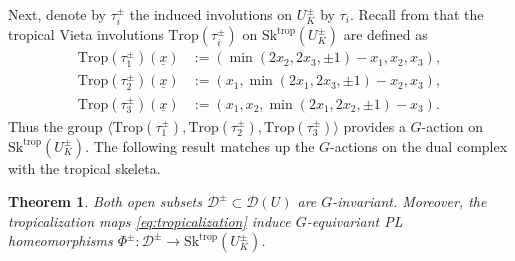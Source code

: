 \documentclass[reqno, 12pt]{amsart}
\newtheorem{thm}[prop]{Theorem}
\theoremstyle{definition}
\newcommand{\cD}{\mathcal{D}}
\newcommand{\Trop}{\mathrm{Trop}}
\newcommand{\trop}{\mathrm{trop}}
\newcommand{\Sk}{\mathrm{Sk}}
\newcommand{\ux}{\underline{x}}
\numberwithin{equation}{section}
\begin{document}

Next, denote by $\tau_i^{\pm}$ the induced involutions on $U_K^{\pm}$ by $\tau_i$. Recall from \cite[(3.1)--(3.3)]{Jan23} that the tropical Vieta involutions $\Trop(\tau_i^{\pm})$ on $\Sk^{\trop}(U_K^{\pm})$ are defined as 
\begin{align*}
\Trop(\tau_1^{\pm})(\ux) & := (\min(2x_2, 2x_3, \pm 1)-x_1, x_2, x_3), \\
\Trop(\tau_2^{\pm})(\ux) & := (x_1, \min(2x_1, 2x_3, \pm 1)-x_2, x_3), \\
\Trop(\tau_3^{\pm})(\ux) & := (x_1, x_2, \min(2x_1, 2x_2, \pm 1)-x_3).
\end{align*}
Thus the group $\langle \Trop(\tau_1^{\pm}), \Trop(\tau_2^{\pm}), \Trop(\tau_3^{\pm})\rangle$ provides a $G$-action on $\Sk^{\trop}(U_K^{\pm})$. The following result matches up the $G$-actions on the dual complex with the tropical skeleta.

\begin{thm}\label{thm:trop-iso-action}
Both open subsets $\cD^{\pm}\subset \cD(U)$ are $G$-invariant. Moreover, the tropicalization maps \eqref{eq:tropicalization} induce $G$-equivariant PL homeomorphisms  $\Phi^{\pm}:\cD^{\pm}\to \Sk^{\trop}(U_K^{\pm})$. %
\end{thm}




\end{document}
